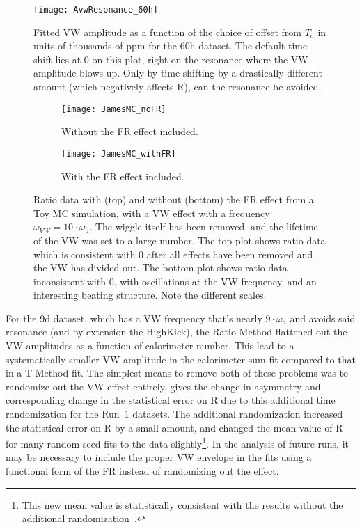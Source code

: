 \begin{figure}
    \centering
    \texttt{[image: AvwResonance\_60h]}
    \caption[VW amplitude resonance in the 60h dataset]{Fitted VW amplitude as a function of the choice of  offset from $T_{a}$ in units of thousands of ppm for the 60h dataset. The default time-shift lies at 0 on this plot, right on the resonance where the VW amplitude blows up. Only by time-shifting by a drastically different amount (which negatively affects R), can the resonance be avoided.}
    \label{fig:VWresonance}
\end{figure}


\begin{figure}
\centering
    \begin{subfigure}[t]{0.6\textwidth}
        \centering
        \texttt{[image: JamesMC\_noFR]}
        \caption{Without the FR effect included.}
    \end{subfigure}%

    \begin{subfigure}[t]{0.6\textwidth}
        \centering
        \texttt{[image: JamesMC\_withFR]}
        \caption{With the FR effect included.}
    \end{subfigure}
\caption[VW envelope in Ratio Method Toy MC data with and without FR effect]{Ratio data with (top) and without (bottom) the FR effect from a Toy MC simulation, with a VW effect with a frequency $\omega_{VW} = 10 \cdot \omega_{a}$. The \wa wiggle itself has been removed, and the lifetime of the VW was set to a large number. The top plot shows ratio data which is consistent with 0 after all effects have been removed and the VW has divided out. The bottom plot shows ratio data inconsistent with 0, with oscillations at the VW frequency, and an interesting beating structure. Note the different scales.}
\label{fig:JamesMC_VW_FR}
\end{figure}


For the 9d dataset, which has a VW frequency that's nearly $9 \cdot \omega_{a}$ and avoids said resonance (and by extension the HighKick), the Ratio Method flattened out the VW amplitudes as a function of calorimeter number. This lead to a systematically smaller VW amplitude in the calorimeter sum fit compared to that in a T-Method fit. The simplest means to remove both of these problems was to randomize out the VW effect entirely.  gives the change in asymmetry and corresponding change in the statistical error on R due to this additional time randomization for the Run~1 datasets. The additional randomization increased the statistical error on R by a small amount, and changed the mean value of R for many random seed fits to the data slightly\footnote{This new mean value is statistically consistent with the results without the additional randomization~\cite{VWinRatio}.}. In the analysis of future runs, it may be necessary to include the proper VW envelope in the fits using a functional form of the FR instead of randomizing out the effect.

